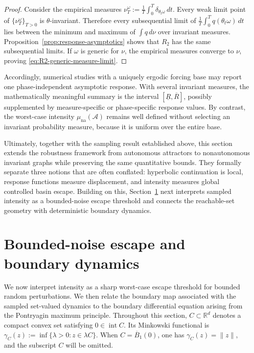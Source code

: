\documentclass[pdflatex,sn-mathphys-num]{sn-jnl}
\numberwithin{equation}{section}
\theoremstyle{thmstyleone}%
\theoremstyle{definition}
\theoremstyle{remark}
\begin{document}
\begin{proof}
Consider the empirical measures $\nu_T^\omega := \frac1T \int_0^T \delta_{\theta_t\omega}\,dt$.
Every weak limit point of $\{\nu_T^\omega\}_{T>0}$ is $\theta$-invariant. Therefore every subsequential limit of $\frac1T\int_0^Tq(\theta_t\omega)\,dt$ lies between the minimum and maximum of $\int q\,d\nu$ over invariant measures. Proposition~\ref{prop:response-asymptotics} shows that $R_2$ has the same subsequential limits. If $\omega$ is generic for $\nu$, the empirical measures converge to $\nu$, proving \eqref{eq:R2-generic-measure-limit}.
\end{proof}

Accordingly, numerical studies with a uniquely ergodic forcing base may report one phase-independent asymptotic response. With several invariant measures, the mathematically meaningful summary is the interval $[\underline R,\overline R]$, possibly supplemented by measure-specific or phase-specific response values. By contrast, the worst-case intensity $\mu_{\mathrm{na}}(\mathcal A)$ remains well defined without selecting an invariant probability measure, because it is uniform over the entire base.

Ultimately, together with the sampling result established above, this section extends the robustness framework from autonomous attractors to nonautonomous invariant graphs while preserving the same quantitative bounds. They formally separate three notions that are often conflated: hyperbolic continuation is local, response functions measure displacement, and intensity measures global controlled basin escape. Building on this, Section~\ref{sec:noise-boundary} next interprets sampled intensity as a bounded-noise escape threshold and connects the reachable-set geometry with deterministic boundary dynamics.

\section{Bounded-noise escape and boundary dynamics}
\label{sec:noise-boundary}

We now interpret intensity as a sharp worst-case escape threshold for bounded random perturbations. We then relate the boundary map associated with the sampled set-valued dynamics to the boundary differential equation
arising from the Pontryagin maximum principle. Throughout this section, $C\subset\mathbb R^d$ denotes a compact convex set satisfying $0\in\operatorname{int}C$. Its Minkowski functional is $\gamma_C(z):=\inf\{\lambda>0:z\in\lambda C\}$. When $C=\overline B_1(0)$, one has $\gamma_C(z)=\|z\|$, and the subscript $C$ will be omitted.
\end{document}
